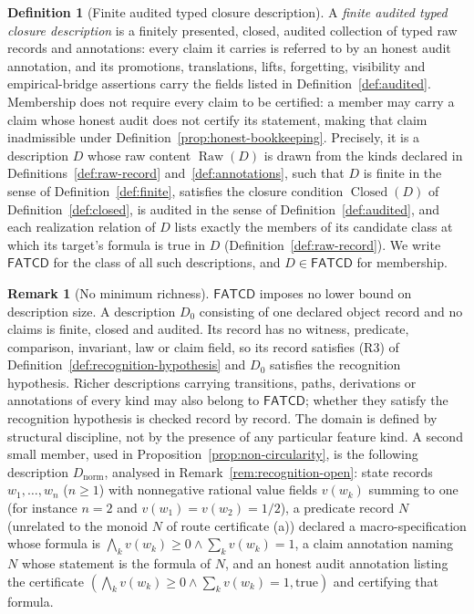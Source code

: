 \documentclass[11pt]{article}
\theoremstyle{definition}
\newtheorem{definition}[theorem]{Definition}
\newtheorem{remark}[theorem]{Remark}
\newcommand{\FATCD}{\ensuremath{\mathsf{FATCD}}}
\newcommand{\Raw}[1]{\ensuremath{\operatorname{Raw}\!\left(#1\right)}}
\newcommand{\Closed}[1]{\ensuremath{\operatorname{Closed}\!\left(#1\right)}}
\begin{document}
\begin{definition}[Finite audited typed closure description]\label{def:fatcd}
A \emph{finite audited typed closure description} is a finitely presented,
closed, audited collection of typed raw records and annotations: every claim
it carries is referred to by an honest audit annotation, and its promotions,
translations, lifts, forgetting, visibility and empirical-bridge assertions
carry the fields listed in Definition~\ref{def:audited}. Membership does not
require every claim to be certified: a member may carry a claim whose honest
audit does not certify its statement, making that claim inadmissible under
Definition~\ref{prop:honest-bookkeeping}. Precisely, it is a
description \(D\) whose raw content \(\Raw{D}\) is drawn from the kinds
declared in Definitions~\ref{def:raw-record} and~\ref{def:annotations}, such
that \(D\) is finite in the sense of Definition~\ref{def:finite}, satisfies
the closure condition \(\Closed{D}\) of Definition~\ref{def:closed}, is
audited in the sense of Definition~\ref{def:audited}, and each realization relation of \(D\) lists exactly the members of its candidate class at which its target's formula is true in \(D\) (Definition~\ref{def:raw-record}). We write \FATCD{} for
the class of all such descriptions, and \(D \in \FATCD{}\) for membership.
\end{definition}

\begin{remark}[No minimum richness]\label{rem:fatcd-minimality}
\FATCD{} imposes no lower bound on description size. A description \(D_0\)
consisting of one declared object record and no claims is finite, closed and
audited. Its record has no witness, predicate, comparison, invariant, law or
claim field, so its record satisfies (R3) of
Definition~\ref{def:recognition-hypothesis} and \(D_0\) satisfies the
recognition hypothesis. Richer descriptions carrying
transitions, paths, derivations or annotations of every kind may also belong
to \FATCD{}; whether they satisfy the recognition hypothesis is checked record
by record. The domain is defined by structural discipline, not by the presence
of any particular feature kind. A second small member, used in
Proposition~\ref{prop:non-circularity}, is the following description \(D_{\mathrm{norm}}\), analysed in
Remark~\ref{rem:recognition-open}: state records \(w_1,\dots,w_n\) (\(n\ge1\))
with nonnegative rational value fields \(v(w_k)\) summing to one (for instance
\(n=2\) and \(v(w_1)=v(w_2)=1/2\)), a predicate record \(N\) (unrelated to the monoid \(N\) of route certificate (a)) declared a
macro-specification whose formula is \(\bigwedge_k v(w_k)\ge0\wedge\sum_k v(w_k)=1\), a claim annotation
naming \(N\) whose statement is the formula of \(N\), and an honest audit
annotation listing the certificate \((\bigwedge_k v(w_k)\ge0\wedge\sum_k v(w_k)=1,\mathrm{true})\) and
certifying that formula.
\end{remark}
\end{document}

